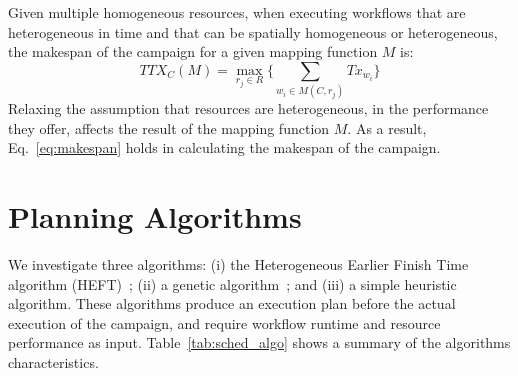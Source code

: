 Given multiple homogeneous resources, when executing workflows that are
heterogeneous in time and that can be spatially homogeneous or heterogeneous,
the makespan of the campaign for a given mapping function $M$ is:
\begin{equation}
TTX_{C}(M) = \max_{r_{j}\in R}\Big\{\sum_{w_{i}\in M(C,r_{j})}Tx_{w_{i}}\Big\}
\label{eq:makespan}
\end{equation}
Relaxing the assumption that resources are heterogeneous, in the performance
they offer, affects the result of the mapping function $M$. As a result,
Eq.~\ref{eq:makespan} holds in calculating the makespan of the campaign.


\section{Planning Algorithms}
\label{sec:algo}

We investigate three algorithms: (i) the Heterogeneous Earlier Finish Time
algorithm (HEFT)~\cite{topcuoglu2002performance}; (ii) a genetic
algorithm~\cite{page2005algorithm}; and (iii) a simple heuristic algorithm. These algorithms produce an execution plan before the actual execution of
the campaign, and require workflow runtime and resource performance as input.
Table~\ref{tab:sched_algo} shows a summary of the algorithms characteristics.

